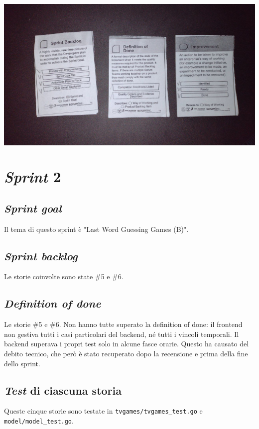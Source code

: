 \documentclass{article}
\begin{document}
\includegraphics[width=\textwidth]{essence-1}

\section{\emph{Sprint} 2}

\subsection{\emph{Sprint goal}}

Il tema di questo sprint è "Last Word Guessing Games (B)".

\subsection{\emph{Sprint backlog}}

Le storie coinvolte sono state \#5 e \#6.

\subsection{\emph{Definition of done}}

Le storie \#5 e \#6. Non hanno tutte superato la definition of
done: il frontend non gestiva tutti i casi particolari del backend, né tutti i
vincoli temporali. Il backend superava i propri test solo in alcune fasce
orarie. Questo ha causato del debito tecnico, che però è stato recuperato dopo
la recensione e prima della fine dello sprint.

\subsection{\emph{Test} di ciascuna storia}

Queste cinque storie sono testate in \verb!tvgames/tvgames_test.go! e
\verb!model/model_test.go!.
\end{document}
